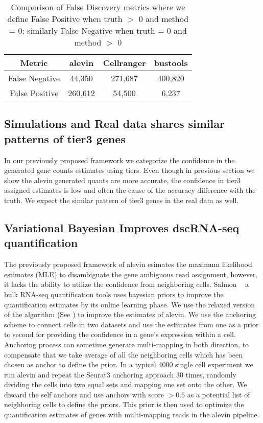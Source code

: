 \begin{table}[h!]
	\centering
	 \begin{tabular}{|| c | c | c | | c||} 
		 \hline
		 Metric & alevin & Cellranger & bustools \\ [0.5ex] 
		 \hline\hline
		 False Negative & 44,350 & 271,687 & 400,820 \\
		 \hline
		 False Positive & 260,612 & 54,500 & 6,237 \\ [1ex] 
		 \hline
 	\end{tabular}
	\caption{Comparison of False Discovery metrics where we define False Positive when truth 
	$>$ 0 and method = 0; similarly False Negative when truth = 0 and method $>$ 0}
	\label{tab:f1}
\end{table}

\subsection{Simulations and Real data shares similar patterns of tier3 genes}
In our previously proposed framework we categorize the confidence in the generated gene counts 
estimates using tiers. Even though in previous section we show the alevin generated quants are 
more accurate, the confidence in tier3 assigned estimates is low and often the cause of the 
accuracy difference with the truth. We expect the similar pattern of tier3 genes in the real 
data as well. 

\subsection{Variational Bayesian Improves dscRNA-seq quantification}
The previously proposed framework of alevin esimates the maximum likelihood estimates (MLE) to 
disambiguate the gene ambiguous read assignment, however, it lacks the ability to utilize the 
confidence from neighboring cells. Salmon ~\citep{salmon} a bulk RNA-seq quantification tools uses 
bayesian priors to improve the quantification estimates by its online learning phase. We use the 
relaxed version of the algorithm (See ) to improve the estimates of alevin. 
We use the anchoring scheme to connect cells in two datasets and use the estimates from one as a 
prior to second for providing the confidence in a gene's expression within a cell. Anchoring process 
can sometime generate multi-mapping in both direction, to compensate that we take average of all 
the neighboring cells which has been chosen as anchor to define the prior. In a typical 4000 single 
cell experiment we run alevin and repeat the Seurat3 anchoring approach $30$ times, randomly dividing 
the cells into two equal sets and mapping one set onto the other. We discard the self anchors and use 
anchors with score $>0.5$ as a potential list of neighboring cells to define the priors. This prior 
is then used to optimize the quantification estimates of genes with multi-mapping reads in the alevin 
pipeline.

